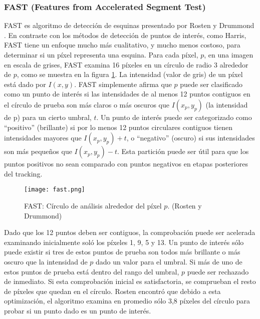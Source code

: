 \subsubsection{FAST (Features from Accelerated Segment Test)} 
FAST es algoritmo de detección de esquinas presentado por Rosten y Drummond \cite{Rosten}. En contraste con los métodos de detección de puntos de interés, como Harris, FAST tiene un enfoque mucho más cualitativo, y mucho menos costoso, para determinar si un píxel representa una esquina. Para cada píxel, $p$, en una imagen en escala de grises, FAST examina 16 píxeles en un círculo de radio 3 alrededor de $p$, como se muestra en la figura \ref{fig:fast}. La intensidad (valor de gris) de un píxel está dado por $I(x, y)$. FAST simplemente afirma que $p$ puede ser clasificado como un punto de interés si las intensidades de al menos 12 puntos contiguos en el círculo de prueba son más claros o más oscuros que $I(x_p, y_p)$ (la intensidad de p) para un cierto  umbral, $t$. Un punto de interés puede ser categorizado como ``positivo'' (brillante) si por lo menos 12 puntos circulares contiguos tienen intensidades mayores que $I(x_p, y_p) + t$, o ``negativo'' (oscuro) si sus intensidades son más pequeños que $I(x_p , y_p) - t$. Esta partición puede ser útil para que los puntos positivos no sean comparado con puntos negativos en etapas posteriores del tracking.

\begin{figure}
  \centering
  \texttt{[image: fast.png]}
  \caption{FAST: Círculo de análisis alrededor del píxel $p$. (Rosten y Drummond)
  }
  \label{fig:fast}
\end{figure}

Dado que los 12 puntos deben ser contiguos, la comprobación puede ser acelerada examinando inicialmente soló los píxeles 1, 9, 5 y 13. Un punto de interés sólo puede existir si tres de estos puntos de prueba son todos más brillante o más oscuro que la intensidad de $p$ dado un valor para el umbral. Si más de uno de estos puntos de prueba está  dentro del rango del umbral, $p$ puede ser rechazado de inmediato. Si esta comprobación inicial es satisfactoria, se comprueban el resto de píxeles que quedan en el círculo. Rosten encontró que debido a esta optimización, el algoritmo examina en promedio sólo 3,8 píxeles del círculo para probar si un punto dado es un punto de interés.

